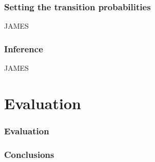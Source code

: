 \documentclass{beamer}
\begin{document}
\begin{frame}
  \frametitle{Setting the transition probabilities}
  JAMES
\end{frame}


\begin{frame}
  \frametitle{Inference}
  JAMES
\end{frame}

\section{Evaluation}
\begin{frame}
  \frametitle{Evaluation}
  
\end{frame}

\begin{frame}
  \frametitle{Conclusions}
\end{frame}
\end{document}

